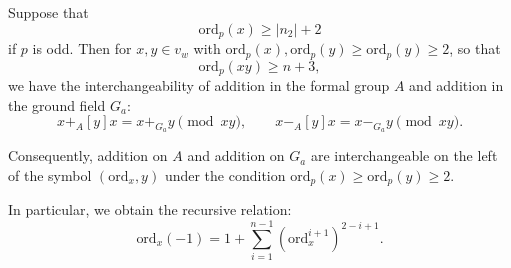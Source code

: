 Suppose that
$$\text{ord}_p(x) \ge |n_2| + 2$$
if $p$ is odd. Then for $x, y \in v_w$ with $\text{ord}_p(x), \text{ord}_p(y) \ge \text{ord}_p(y) \ge 2$, so that
$$\text{ord}_p(xy) \ge n + 3,$$
we have the interchangeability of addition in the formal group $A$ and addition in the ground field $G_a$:
$$x +_A [y] x = x +_{G_a} y \pmod{xy}, \qquad x -_A [y] x = x -_{G_a} y \pmod{xy}.$$

Consequently, addition on $A$ and addition on $G_a$ are interchangeable on the left of the symbol $(\text{ord}_x, y)$ under the condition $\text{ord}_p(x) \ge \text{ord}_p(y) \ge 2$.

In particular, we obtain the recursive relation:
$$\text{ord}_x(-1) = 1 + \sum_{i=1}^{n-1} (\text{ord}_x^{i+1})^{2-i+1}.$$
